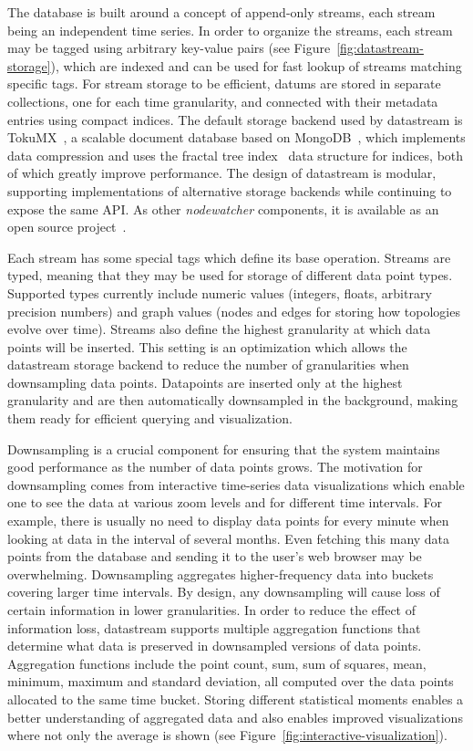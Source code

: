 \documentclass[5p,sort&compress]{elsarticle}
\newcommand{\nodewatcher}{\textit{nodewatcher}}
\begin{document}
The database is built around a concept of append-only streams, each stream being an independent time series.
In order to organize the streams, each stream may be tagged using arbitrary key-value pairs (see Figure~\ref{fig:datastream-storage}), which are indexed and can be used for fast lookup of streams matching specific tags.
For stream storage to be efficient, datums are stored in separate collections, one for each time granularity, and connected with their metadata entries using compact indices.
The default storage backend used by datastream is TokuMX~\cite{TokuMX_2007}, a scalable document database based on MongoDB~\cite{MongoDB_2007}, which implements data compression and uses the fractal tree index~\cite{Brodal_2003,Bender_2007} data structure for indices, both of which greatly improve performance.
The design of datastream is modular, supporting implementations of alternative storage backends while continuing to expose the same API.
As other \nodewatcher{} components, it is available as an open source project~\cite{Datastream_2012}.

Each stream has some special tags which define its base operation.
Streams are typed, meaning that they may be used for storage of different data point types.
Supported types currently include numeric values (integers, floats, arbitrary precision numbers) and graph values (nodes and edges for storing how topologies evolve over time).
Streams also define the highest granularity at which data points will be inserted.
This setting is an optimization which allows the datastream storage backend to reduce the number of granularities when downsampling data points.
Datapoints are inserted only at the highest granularity and are then automatically downsampled in the background, making them ready for efficient querying and visualization.

Downsampling is a crucial component for ensuring that the system maintains good performance as the number of data points grows.
The motivation for downsampling comes from interactive time-series data visualizations which enable one to see the data at various zoom levels and for different time intervals.
For example, there is usually no need to display data points for every minute when looking at data in the interval of several months.
Even fetching this many data points from the database and sending it to the user's web browser may be overwhelming.
Downsampling aggregates higher-frequency data into buckets covering larger time intervals.
By design, any downsampling will cause loss of certain information in lower granularities.
In order to reduce the effect of information loss, datastream supports multiple aggregation functions that determine what data is preserved in downsampled versions of data points.
Aggregation functions include the point count, sum, sum of squares, mean, minimum, maximum and standard deviation, all computed over the data points allocated to the same time bucket.
Storing different statistical moments enables a better understanding of aggregated data and also enables improved visualizations where not only the average is shown (see Figure~\ref{fig:interactive-visualization}).
\end{document}
